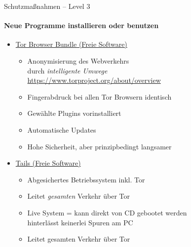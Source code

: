 \begin{frame}{Schutzmaßnahmen -- Level 3}
\framesubtitle{Neue Programme installieren oder benutzen}
  \begin{itemize}
    \item \href{https://www.torproject.org}{Tor Browser Bundle (Freie Software)}
    \begin{itemize}
      \item Anonymisierung des Webverkehrs\\durch \emph{\glqq intelligente Umwege\grqq}\\
        \scriptsize \url{https://www.torproject.org/about/overview} \normalsize
      \item Fingerabdruck bei allen Tor Browsern identisch
      \item Gewählte Plugins vorinstalliert
      \item Automatische Updates
      \item Hohe Sicherheit, aber prinzipbedingt langsamer
    \end{itemize}
    \pause
    \item \href{https://tails.boum.org}{Tails (Freie Software)}
    \begin{itemize}
      \item Abgesichertes Betriebssystem inkl. Tor
      \item Leitet \emph{gesamten} Verkehr über Tor
      \item Live System = kann direkt von CD gebootet werden\\ hinterlässt keinerlei Spuren am PC
      \item Leitet gesamten Verkehr über Tor
    \end{itemize}
  \end{itemize}
\end{frame}

\endinput
